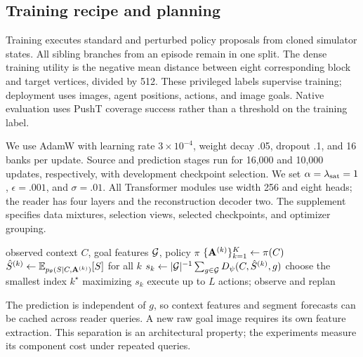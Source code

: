\subsection{Training recipe and planning}
\label{sec:training}
Training executes standard and perturbed policy proposals from cloned simulator states. All sibling branches from an episode remain in one split. The dense training utility is the negative mean distance between eight corresponding block and target vertices, divided by 512. These privileged labels supervise training; deployment uses images, agent positions, actions, and image goals. Native evaluation uses PushT coverage success rather than a threshold on the training label.

We use AdamW with learning rate $3\times10^{-4}$, weight decay .05, dropout .1, and 16 banks per update. Source and prediction stages run for 16,000 and 10,000 updates, respectively, with development checkpoint selection. We set $\alpha=\lambda_{\rm sat}=1$, $\epsilon=.001$, and $\sigma=.01$. All Transformer modules use width 256 and eight heads; the reader has four layers and the reconstruction decoder two. The supplement specifies data mixtures, selection views, selected checkpoints, and optimizer grouping.

\begin{algorithm}[t]
\caption{CTA world-model planning at one decision}
\label{alg:cta}
\small
\begin{algorithmic}[1]
\Require observed context $C$, goal features $\mathcal{G}$, policy $\pi$
\State $\{\mathbf{A}^{(k)}\}_{k=1}^{K}\gets\pi(C)$
\State $\hat S^{(k)}\gets\mathbb{E}_{p_\theta(S\mid C,\mathbf{A}^{(k)})}[S]$ for all $k$
\State $s_k\gets|\mathcal{G}|^{-1}\sum_{g\in\mathcal{G}}D_\psi(C,\hat S^{(k)},g)$
\State choose the smallest index $k^\star$ maximizing $s_k$
\State execute up to $L$ actions; observe and replan
\end{algorithmic}
\end{algorithm}
The prediction is independent of $g$, so context features and segment forecasts can be cached across reader queries. A new raw goal image requires its own feature extraction. This separation is an architectural property; the experiments measure its component cost under repeated queries.
